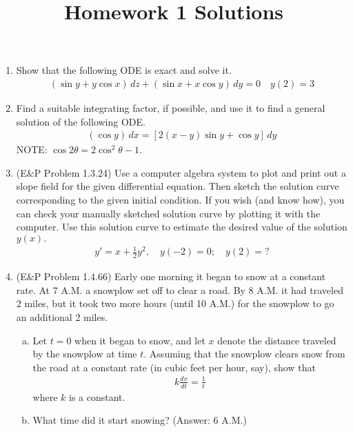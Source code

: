 \documentclass{article}
\begin{document}
\title{Homework 1 Solutions}
\maketitle
\thispagestyle{fancy}

\begin{enumerate}
	\item Show that the following ODE is exact and solve it.
		\begin{align*}
			(\sin y + y\cos x)\, dz + (\sin x + x\cos y)\, dy = 0 \quad y(2)=3
		\end{align*}

	\item Find a suitable integrating factor, if possible, and use it to find a general solution of the following ODE.
		\begin{align*}
			(\cos y)\, dx = \left[ 2(x-y)\sin y + \cos y \right]\, dy
		\end{align*}
		NOTE: $\cos 2\theta = 2\cos^2\theta-1.$

	\item (E\&P Problem 1.3.24) Use a computer algebra system to plot and print out a slope field for the given differential equation. Then sketch the solution curve corresponding to the given initial condition. If you wish (and know how), you can check your manually sketched solution curve by plotting it with the computer. Use this solution curve to estimate the desired value of the solution $y(x).$
		\begin{align*}
			y'=x+\frac{1}{2} y^2, \quad y(-2)=0; \quad y(2)=?
		\end{align*}

	\item (E\&P Problem 1.4.66) Early one morning it began to snow at a constant rate. At 7 A.M. a snowplow set off to clear a road. By 8 A.M. it had traveled 2 miles, but it took two more hours (until 10 A.M.) for the snowplow to go an additional 2 miles.
		\begin{enumerate}[(a)]
			\item Let $t=0$ when it began to snow, and let $x$ denote the distance traveled by the snowplow at time $t.$ Assuming that the snowplow clears snow from the road at a constant rate (in cubic feet per hour, say), show that
				\begin{align*}
					k\frac{dx}{dt} = \frac{1}{t}
				\end{align*}
				where $k$ is a constant.

			\item What time did it start snowing? (Answer: 6 A.M.)
				

\end{enumerate}
\end{enumerate}
\end{document}
